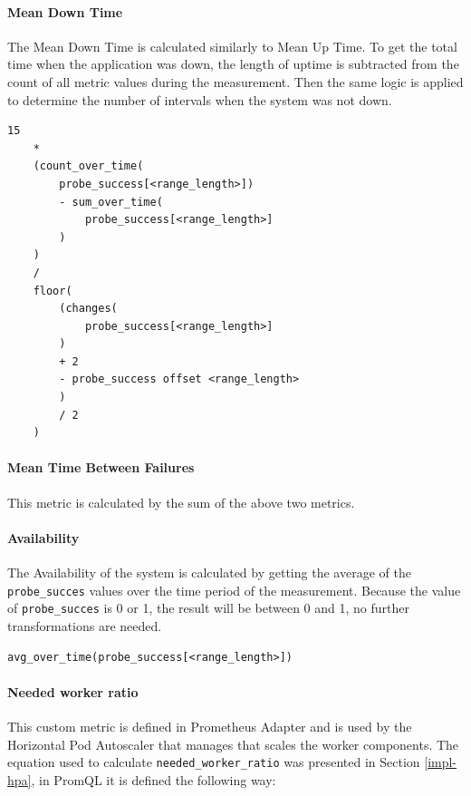  \paragraph{Mean Down Time} The Mean Down Time is calculated similarly to Mean Up Time. To get the total time when the application was down, the length of uptime is subtracted from the count of all metric values during the measurement. Then the same logic is applied to determine the number of intervals when the system was not down.
 
 \vspace{0.5cm}
 \begin{minipage}{\linewidth}
 	\begin{lstlisting}[caption={Mean Up Time defined in PromQL}, label={lst:promql-mut}]
 	15 
 	* 
 	(count_over_time(
 		probe_success[<range_length>])
 		- sum_over_time(
 			probe_success[<range_length>]
 		)
 	)
 	/ 
 	floor(
 		(changes(
 			probe_success[<range_length>]
 		)
 		+ 2
 		- probe_success offset <range_length>
 		)
 		/ 2
 	)\end{lstlisting}
 \end{minipage}
 
 \paragraph{Mean Time Between Failures} This metric is calculated by the sum of the above two metrics.
 
 \paragraph{Availability} The Availability of the system is calculated by getting the average of the \texttt{probe\_succes} values over the time period of the measurement. Because the value of \texttt{probe\_succes} is 0 or 1, the result will be between 0 and 1, no further transformations are needed.
 
 \vspace{0.5cm}
 \begin{minipage}{\linewidth}
 	\begin{lstlisting}[caption={Availability defined in PromQL}, label={lst:promql-availability}]
 	avg_over_time(probe_success[<range_length>])\end{lstlisting}
 \end{minipage}

\paragraph{Needed worker ratio} This custom metric is defined in Prometheus Adapter and is used by the Horizontal Pod Autoscaler that manages that scales the worker components. The equation used to calculate \texttt{needed\_worker\_ratio} was presented in Section \ref{impl-hpa}, in PromQL it is defined the following way:


